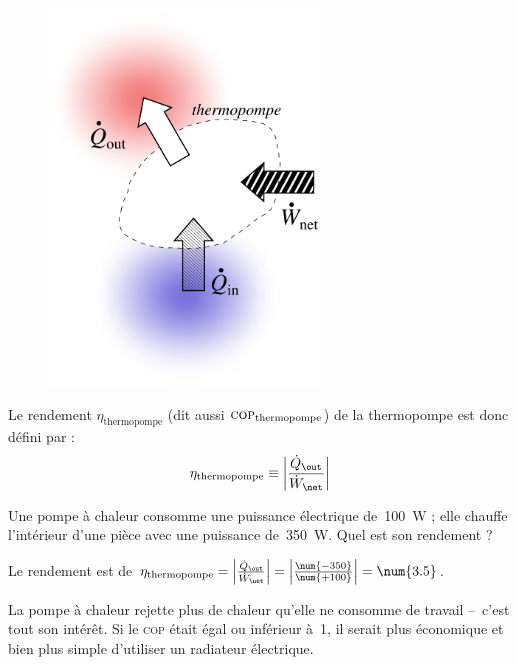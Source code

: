 		\begin{figure}
			\begin{center}
				\includegraphics[height=10cm]{images/efficacite_thermopompe.png}
			\end{center}
			\label{fig_transferts_thermopompe}
		\end{figure}

		Le rendement $\eta_\text{thermopompe}$ (dit aussi $\textsc{cop}_\text{thermopompe}$) de la thermopompe est donc défini par :
		\begin{equation}
			\eta_\text{thermopompe} \equiv  \left| \frac{\dot Q_\out}{\dot W_\net} \right|
			\label{def_rendement_thermopompe}
		\end{equation}
	
			\begin{anexample}
				Une pompe à chaleur consomme une puissance électrique de~\SI{100}{\watt} ; elle chauffe l’intérieur d’une pièce avec une puissance de~\SI{350}{\watt}. Quel est son rendement ?
		
				\begin{answer}
					Le rendement est de $\eta_\text{thermopompe} = \left| \frac{\dot Q_\out}{\dot W_\net} \right| = \left| \frac{\num{-350}}{\num{+100}} \right| = \num{3.5}$. 
						\begin{remark} La pompe à chaleur rejette plus de chaleur qu’elle ne consomme de travail –\ c’est tout son intérêt. Si le \textsc{cop} était égal ou inférieur à~\num{1}, il serait plus économique et bien plus simple d’utiliser un radiateur électrique.\end{remark}
				\end{answer}
			\end{anexample}


